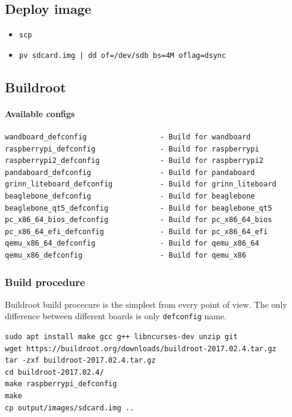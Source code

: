 \documentclass[printmode]{mgr}
\begin{document}
\subsection{Deploy image}

\begin{itemize}
  \item \verb|scp|
  \item \verb!pv sdcard.img | dd of=/dev/sdb bs=4M oflag=dsync!
\end{itemize}

\subsection{Buildroot}

\paragraph{Available configs}

\begin{verbatim}
wandboard_defconfig                 - Build for wandboard
raspberrypi_defconfig               - Build for raspberrypi
raspberrypi2_defconfig              - Build for raspberrypi2
pandaboard_defconfig                - Build for pandaboard
grinn_liteboard_defconfig           - Build for grinn_liteboard
beaglebone_defconfig                - Build for beaglebone
beaglebone_qt5_defconfig            - Build for beaglebone_qt5
pc_x86_64_bios_defconfig            - Build for pc_x86_64_bios
pc_x86_64_efi_defconfig             - Build for pc_x86_64_efi
qemu_x86_64_defconfig               - Build for qemu_x86_64
qemu_x86_defconfig                  - Build for qemu_x86
\end{verbatim}

\subsubsection{Build procedure}

Buildroot build procecure is the simplest from every point of view.
The only difference between different boards is only \verb|defconfig| name.

\begin{lstlisting}
sudo apt install make gcc g++ libncurses-dev unzip git
wget https://buildroot.org/downloads/buildroot-2017.02.4.tar.gz
tar -zxf buildroot-2017.02.4.tar.gz
cd buildroot-2017.02.4/
make raspberrypi_defconfig
make
cp output/images/sdcard.img ..
\end{lstlisting}
\end{document}
